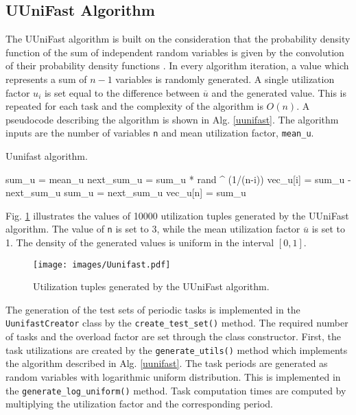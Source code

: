 \subsection{UUniFast Algorithm}
The UUniFast algorithm is built on the consideration that the probability density function of the sum of independent random variables is given by the convolution of their probability density functions \cite{bini2005measuring}.
In every algorithm iteration, a value which represents a sum of $n-1$ variables is randomly generated.
A single utilization factor $u_i$ is set equal to the difference between $\overline{u}$ and the generated value.
This is repeated for each task and the complexity of the algorithm is $O(n)$.
A pseudocode describing the algorithm is shown in Alg. \ref{uunifast}.
The algorithm inputs are the number of variables \texttt{n} and mean utilization factor, \texttt{mean\_u}.
\begin{algorithm}
\caption{Uunifast algorithm.\label{uunifast}}
\begin{algorithmic}[1]
\State sum\_u = mean\_u
\State next\_sum\_u = sum\_u * rand \^{} (1/(n-i))
\State vec\_u[i] = sum\_u - next\_sum\_u
\State sum\_u = next\_sum\_u
\EndFor
\State vec\_u[n] = sum\_u
\end{algorithmic}
\end{algorithm}
Fig. \ref{uunifast:fig} illustrates the values of 10000 utilization tuples generated by the UUniFast algorithm.
The value of \texttt{n} is set to 3, while the mean utilization factor $\overline{u}$ is set to 1.
The density of the generated values is uniform in the interval $[0, 1]$.
\begin{figure}[ht]
    \centering
    \texttt{[image: images/Uunifast.pdf]}
    \caption{Utilization tuples generated by the UUniFast algorithm.}
    \label{uunifast:fig}
\end{figure}

The generation of the test sets of periodic tasks is implemented in the 
\\\texttt{UunifastCreator} class by the \texttt{create\_test\_set()} method.
The required number of tasks and the overload factor are set through the class constructor.
First, the task utilizations are created by the \texttt{generate\_utils()} method which implements the algorithm described in Alg. \ref{uunifast}.
The task periods are generated as random variables with logarithmic uniform distribution.
This is implemented in the \texttt{generate\_log\_uniform()} method.
Task computation times are computed by multiplying the utilization factor and the corresponding period.

